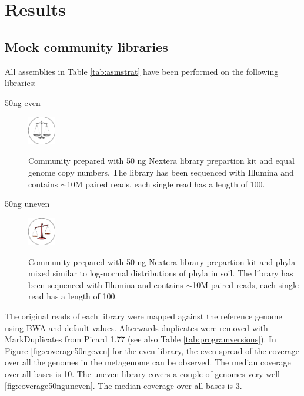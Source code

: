 \documentclass[a4paper,12pt]{report}
\begin{document}
\chapter{Results}

\section{Mock community libraries}
All assemblies in Table \ref{tab:asmstrat} have been performed on the
following libraries:
\begin{description}

\item[50ng even]

    \includegraphics[width=0.1\textwidth]{figures/logos/even.png}

    Community prepared with 50 ng Nextera library prepartion kit and equal
genome copy numbers. The library has been sequenced with Illumina and contains
$\sim$10M paired reads, each single read has a length of 100.

\item[50ng uneven]

    \includegraphics[width=0.1\textwidth]{figures/logos/uneven.png}
    
    Community prepared with 50 ng Nextera library prepartion kit
and phyla mixed similar to log-normal distributions of phyla in soil. The
library has been sequenced with Illumina and contains $\sim$10M paired reads,
each single read has a length of 100.
\end{description}

The original reads of each library were mapped against the reference genome
using BWA \cite{Li20080505} and default values. Afterwards duplicates were
removed with MarkDuplicates from Picard 1.77 (see also Table
\ref{tab:programversions}). In Figure \ref{fig:coverage50ngeven} for the even
library, the even
spread of the coverage over all the genomes in the metagenome can be observed. The median
coverage over all bases is 10. The uneven library covers a couple of genomes
very well \ref{fig:coverage50nguneven}. The median coverage over all bases is 3.\\
\end{document}
